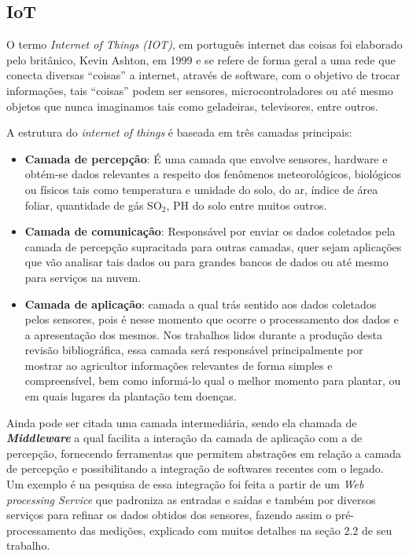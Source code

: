 \documentclass[
article,			%
12pt,				%
oneside,			%
a4paper,			%
english,			%
brazil,				%
sumario=tradicional
]{abntex2}
\begin{document}
\subsection{IoT}
O termo \textit{Internet of Things (IOT)}, em português internet das coisas foi elaborado pelo britânico, Kevin Ashton, em 1999\cite{tzounis2017internet} e se refere de forma geral a uma rede que conecta diversas ``coisas'' a internet, através de software, com o objetivo de trocar informações\cite{defIot}, tais ``coisas'' podem ser sensores, microcontroladores ou até mesmo objetos que nunca imaginamos tais como geladeiras, televisores, entre outros.

A estrutura do \textit{internet of things} é baseada em três camadas principais\cite{tzounis2017internet}:
\begin{itemize}
	\item \textbf{Camada de percepção}: É uma camada que envolve sensores, hardware e obtém-se dados relevantes a respeito dos fenômenos meteorológicos, biológicos ou físicos tais como  temperatura e umidade do solo\cite{kizito2008frequency}, do ar\cite{mesas2015open}, índice de área foliar\cite{bauer2016potential}, quantidade de gás SO$_{2}$\cite{karimi2018web}, PH do solo\cite{karimi2018web} entre muitos outros.
	\item \textbf{Camada de comunicação}: Responsável por enviar os dados coletados pela camada de percepção supracitada para outras camadas, quer sejam aplicações que vão analisar tais dados ou para grandes bancos de dados ou até mesmo para serviços na nuvem.
	\item \textbf{Camada de aplicação}: camada a qual trás sentido aos dados coletados pelos sensores, pois é nesse momento que ocorre o processamento dos dados e a apresentação dos mesmos. Nos trabalhos lidos durante a produção desta revisão bibliográfica, essa camada será responsável principalmente por mostrar ao agricultor informações relevantes de forma simples e compreensível, bem como informá-lo qual o melhor momento para plantar\cite{kath2019soil}, ou em quais lugares da plantação tem doenças\cite{trilles2019development}.
\end{itemize}

Ainda pode ser citada uma camada intermediária, sendo ela chamada de \textit{\bfseries Middleware} a qual facilita a interação da camada de aplicação com a de percepção\cite{tzounis2017internet}, fornecendo ferramentas que permitem abstrações em relação a camada de percepção e possibilitando a integração de softwares recentes com o legado\cite{tzounis2017internet}. Um exemplo é na pesquisa de \cite{sawant2017interoperable} essa integração foi feita a partir de um \textit{Web processing Service} que padroniza as entradas e saídas e também por diversos serviços para refinar os dados obtidos dos sensores, fazendo assim o pré-processamento das medições, explicado com muitos detalhes na seção 2.2 de seu trabalho.
\end{document}
